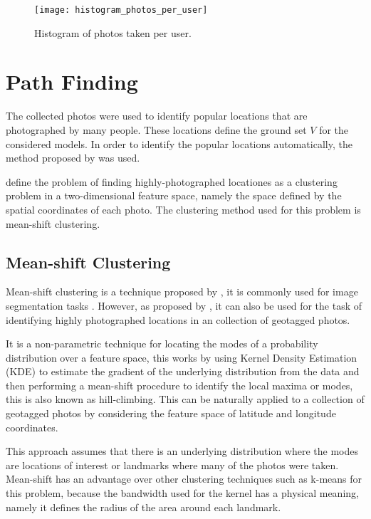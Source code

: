 \begin{figure}
  \centering
  \texttt{[image: histogram\_photos\_per\_user]}
  \caption{Histogram of photos taken per user.}
  \label{fig:photo_user_distribution}
\end{figure}

\section{Path Finding}
\label{sec:path_discovery}

The collected photos were used to identify popular locations that are photographed by many people. These locations define the ground set $V$ for the considered models. In order to identify the popular locations automatically, the method proposed by \citet{Kleinberg2009} was used.

\citet{Kleinberg2009} define the problem of finding highly-photographed locationes as a clustering problem in a two-dimensional feature space, namely the space defined by the spatial coordinates of each photo. The clustering method used for this problem is mean-shift clustering.

\subsection{Mean-shift Clustering}
\label{sec:mean-shift}

Mean-shift clustering is a technique proposed by \citet{cheng1995mean}, it is commonly used for image segmentation tasks \citep{comaniciu2002mean}. However, as proposed by \citet{Kleinberg2009}, it can also be used for the task of identifying highly photographed locations in an collection of geotagged photos.

It is a non-parametric technique for locating the modes of a probability distribution over a feature space, this works by using Kernel Density Estimation (KDE) to estimate the gradient of the underlying distribution from the data and then performing a mean-shift procedure to identify the local maxima or modes, this is also known as hill-climbing. This can be naturally applied to a collection of geotagged photos by considering the feature space of latitude and longitude coordinates.

This approach assumes that there is an underlying distribution where the modes are locations of interest or landmarks where many of the photos were taken. Mean-shift has an advantage over other clustering techniques such as k-means for this problem, because the bandwidth used for the kernel has a physical meaning, namely it defines the radius of the area around each landmark.

